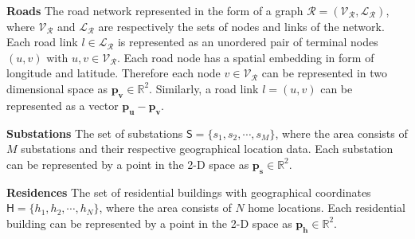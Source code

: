 \documentclass[sigconf]{acmart}
\newcommand{\tabitem}{~\llap{\textbullet}~}
\begin{document}
\begin{table}[htb]
\end{table}

\noindent\textbf{Roads} The road network represented in the form of a graph $\mathcal{R}=(\mathcal{V_R},\mathcal{L_R})$, where $\mathcal{V_R}$ and $\mathcal{L_R}$ are respectively the sets of nodes and links of the network. Each road link $l\in\mathcal{L_R}$ is represented as an unordered pair of terminal nodes $(u,v)$ with $u,v\in\mathcal{V_R}$. Each road node has a spatial embedding in form of longitude and latitude. Therefore each node $v\in\mathcal{V_R}$ can be represented in two dimensional space as $\mathbf{p_v}\in\mathbb{R}^2$. Similarly, a road link $l=(u,v)$ can be represented as a vector $\mathbf{p_u}-\mathbf{p_v}$.

\noindent\textbf{Substations} The set of substations $\mathsf{S}=\{s_1,s_2,\cdots,s_M\}$, where the area consists of $M$ substations and their respective geographical location data. Each substation can be represented by a point in the 2-D space as $\mathbf{p_s}\in\mathbb{R}^2$.

\noindent\textbf{Residences} The set of residential buildings with geographical coordinates $\mathsf{H}=\{h_1,h_2,\cdots,h_N\}$, where the area consists of $N$ home locations. Each residential building can be represented by a point in the 2-D space as $\mathbf{p_h}\in\mathbb{R}^2$.
\end{document}
